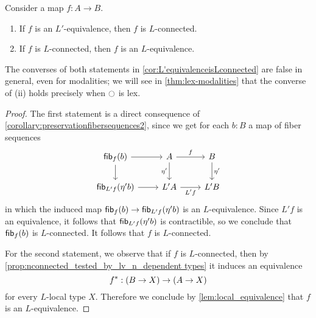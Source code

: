 \begin{prp}\label{cor:L'equivalenceisLconnected}
Consider a map $f:A\to B$.
\begin{enumerate}
\item If $f$ is an $L'$-equivalence, then $f$ is $L$-connected.
\item If $f$ is $L$-connected, then $f$ is an $L$-equivalence.
\end{enumerate}
\end{prp}

The converses of both statements in \cref{cor:L'equivalenceisLconnected} are false in general, even for modalities; we will see in \cref{thm:lex-modalities} that the converse of (ii) holds precisely when ${\ocircle}$ is lex.

\begin{proof}
The first statement is a direct consequence of \cref{corollary:preservationfibersequences2}, since we get for each $b:B$ a map of fiber sequences
\begin{equation*}
\begin{tikzcd}
\fib{f}{b} \arrow[r] \arrow[d] & A \arrow[r,"f"] \arrow[d,swap,"\eta'"] & B \arrow[d,"\eta'"] \\
\fib{L'f}{\eta'b} \arrow[r] & L'A \arrow[r,swap,"L'f"] & L'B
\end{tikzcd}
\end{equation*}
in which the induced map $\mathsf{fib}_{f}(b)\to\mathsf{fib}_{L'f}(\eta'b)$ is an $L$-equivalence. Since $L'f$ is an equivalence, it follows that $\mathsf{fib}_{L'f}(\eta'b)$ is contractible, so we conclude that $\mathsf{fib}_{f}(b)$ is $L$-connected. It follows that $f$ is $L$-connected.

For the second statement, we observe that if $f$ is $L$-connected, then by \cref{prop:nconnected_tested_by_lv_n_dependent types} it induces an equivalence
\begin{equation*}
{f}^\ast : (B\to X)\to (A\to X)
\end{equation*}
for every $L$-local type $X$. Therefore we conclude by \cref{lem:local_equivalence} that $f$ is an $L$-equivalence.
\end{proof}

